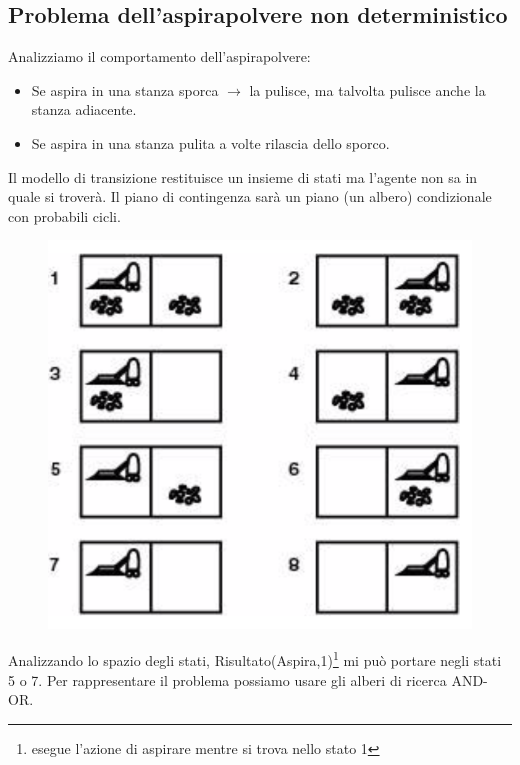 \documentclass{article}
\begin{document}
\subsection{Problema dell'aspirapolvere non deterministico}
Analizziamo il comportamento dell'aspirapolvere:
\begin{itemize}
    \item Se aspira in una stanza sporca $\rightarrow$ la pulisce, ma talvolta pulisce anche la stanza adiacente.
    \item Se aspira in una stanza pulita a volte rilascia dello sporco.
\end{itemize}
Il modello di transizione restituisce un insieme di stati ma l'agente non sa in quale si troverà. Il piano di contingenza sarà un piano (un albero) condizionale con probabili cicli.
\begin{figure}[H]
    \centering
    \includegraphics[scale=0.4]{Images/statiaspirapolvere.png}
\end{figure}
Analizzando lo spazio degli stati, Risultato(Aspira,1)\footnote{esegue l'azione di aspirare mentre si trova nello stato 1} mi può portare negli stati 5 o 7. Per rappresentare il problema possiamo usare gli alberi di ricerca AND-OR.
\end{document}

